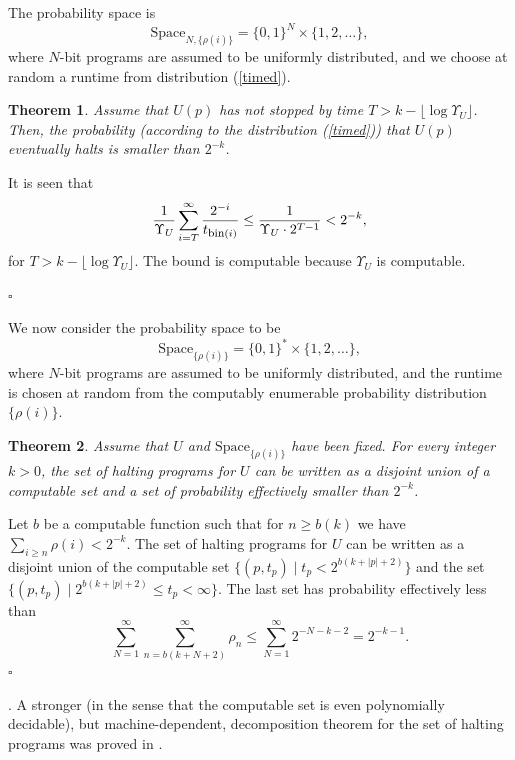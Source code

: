 \documentclass[12pt,twoside,openright]{report}
\newtheorem{thm}{Theorem}
\newcommand{\QED}{\hfill $\square$}
\newcommand{\fbin}{\mbox{\rm \footnotesize{bin}}}
\newcommand{\myproof}{\noindent {\em Proof.}  }
\newcommand{\Space}{\mbox{Space}}
\begin{document}
The probability space is 
\[\Space_{N, \{\rho(i)\}} = \{0, 1\}^{N} \times \{1,2,\ldots \},\]
\noindent where $N$-bit programs are assumed to be uniformly distributed, and we choose at random a runtime from distribution (\ref{timed}).

\medskip


\begin{thm}
Assume that $U(p)$ has not stopped by time $T> k - \lfloor \log \Upsilon_{U} \rfloor$. Then, the probability (according to the distribution (\ref{timed})) that $U(p)$ eventually halts is smaller than $2^{-k}$.
\end{thm}

\myproof It is seen that 
\[     \frac{1}{\Upsilon_{U}} \sum_{i=T}^{\infty} \frac{2^{-i}}{t_{\fbin(i)}} 
   \le \frac{1}{\Upsilon_{U} \cdot 2^{T-1}} < 2^{-k},\]
for $T> k - \lfloor \log \Upsilon_{U} \rfloor$. The bound is computable because $\Upsilon_{U}$ is computable.

\QED


We now consider the probability space to be 
\[\Space_{\{\rho(i)\}} = \{0, 1\}^{*} \times \{1,2,\ldots \},\]
\noindent where $N$-bit programs  are assumed to be uniformly distributed, and the runtime is chosen at random from the computably enumerable probability distribution  $\{\rho(i)\}$. 

\medskip


\begin{thm}
Assume that $U$ and $\Space_{\{\rho(i)\}}$ have been fixed.  For every integer $k >0$, the set of halting programs for $U$ can be written as  a disjoint union of a computable set and a set of probability effectively smaller than  $2^{-k}$.
\end{thm}

\myproof Let $b$ be a computable function such that for $n\ge b(k)$ we have  $\sum_{i\ge n} \rho(i) < 2^{-k}$.  The set of halting programs for $U$ can be written as  a disjoint union of the computable set $\{(p,t_{p}) \mid t_{p} < 2^{b(k+|p|+2)}\}$ and the set $\{(p,t_{p}) \mid 2^{b(k+|p|+2)} \le t_{p}  < \infty \}$. The last set has probability effectively less than 
\[      \sum_{N=1}^{\infty} \sum_{n=b(k+N+2)}^{\infty} \rho_{n}
    \le \sum_{N=1}^{\infty} 2^{-N-k-2} = 2^{-k-1}.\]
\QED

\medskip

. A stronger (in the sense that the computable set is even polynomially decidable), but machine-dependent, decomposition theorem for the set of halting programs was proved in \cite{HM}.
\end{document}
